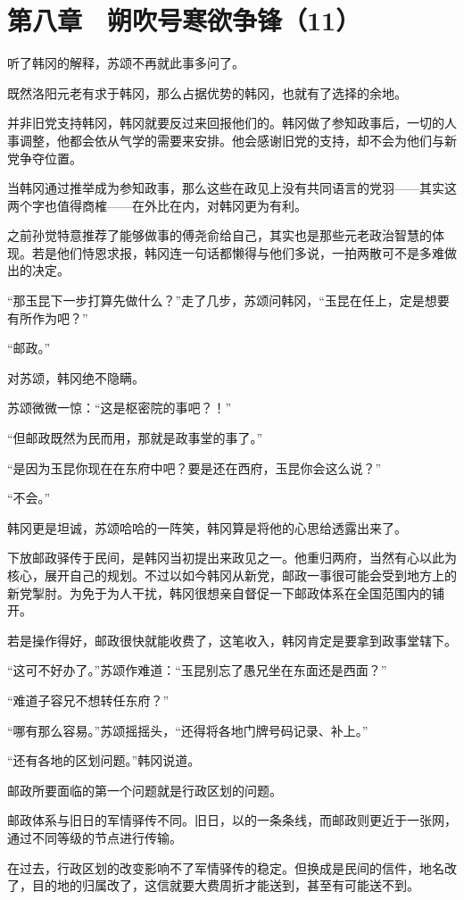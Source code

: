 \section{第八章　朔吹号寒欲争锋（11）}

听了韩冈的解释，苏颂不再就此事多问了。

既然洛阳元老有求于韩冈，那么占据优势的韩冈，也就有了选择的余地。

并非旧党支持韩冈，韩冈就要反过来回报他们的。韩冈做了参知政事后，一切的人事调整，他都会依从气学的需要来安排。他会感谢旧党的支持，却不会为他们与新党争夺位置。

当韩冈通过推举成为参知政事，那么这些在政见上没有共同语言的党羽——其实这两个字也值得商榷——在外比在内，对韩冈更为有利。

之前孙觉特意推荐了能够做事的傅尧俞给自己，其实也是那些元老政治智慧的体现。若是他们恃恩求报，韩冈连一句话都懒得与他们多说，一拍两散可不是多难做出的决定。

“那玉昆下一步打算先做什么？”走了几步，苏颂问韩冈，“玉昆在任上，定是想要有所作为吧？”

“邮政。”

对苏颂，韩冈绝不隐瞒。

苏颂微微一惊：“这是枢密院的事吧？！”

“但邮政既然为民而用，那就是政事堂的事了。”

“是因为玉昆你现在在东府中吧？要是还在西府，玉昆你会这么说？”

“不会。”

韩冈更是坦诚，苏颂哈哈的一阵笑，韩冈算是将他的心思给透露出来了。

下放邮政驿传于民间，是韩冈当初提出来政见之一。他重归两府，当然有心以此为核心，展开自己的规划。不过以如今韩冈从新党，邮政一事很可能会受到地方上的新党掣肘。为免于为人干扰，韩冈很想亲自督促一下邮政体系在全国范围内的铺开。

若是操作得好，邮政很快就能收费了，这笔收入，韩冈肯定是要拿到政事堂辖下。

“这可不好办了。”苏颂作难道：“玉昆别忘了愚兄坐在东面还是西面？”

“难道子容兄不想转任东府？”

“哪有那么容易。”苏颂摇摇头，“还得将各地门牌号码记录、补上。”

“还有各地的区划问题。”韩冈说道。

邮政所要面临的第一个问题就是行政区划的问题。

邮政体系与旧日的军情驿传不同。旧日，以的一条条线，而邮政则更近于一张网，通过不同等级的节点进行传输。

在过去，行政区划的改变影响不了军情驿传的稳定。但换成是民间的信件，地名改了，目的地的归属改了，这信就要大费周折才能送到，甚至有可能送不到。

